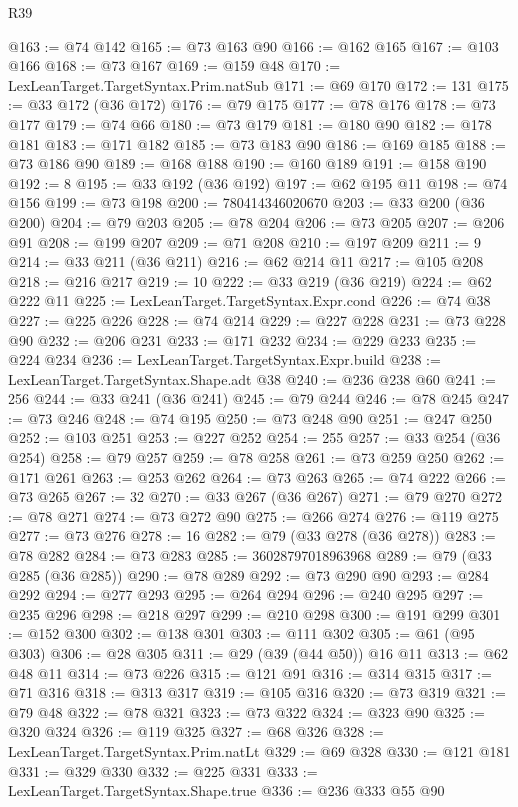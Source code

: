\begin{lexlean}{R39}
\begin{coremodule}
@163 := @74 @142
@165 := @73 @163 @90
@166 := @162 @165
@167 := @103 @166
@168 := @73 @167
@169 := @159 @48
@170 := LexLeanTarget.TargetSyntax.Prim.natSub
@171 := @69 @170
@172 := 131
@175 := @33 @172 (@36 @172)
@176 := @79 @175
@177 := @78 @176
@178 := @73 @177
@179 := @74 @66
@180 := @73 @179
@181 := @180 @90
@182 := @178 @181
@183 := @171 @182
@185 := @73 @183 @90
@186 := @169 @185
@188 := @73 @186 @90
@189 := @168 @188
@190 := @160 @189
@191 := @158 @190
@192 := 8
@195 := @33 @192 (@36 @192)
@197 := @62 @195 @11
@198 := @74 @156
@199 := @73 @198
@200 := 780414346020670
@203 := @33 @200 (@36 @200)
@204 := @79 @203
@205 := @78 @204
@206 := @73 @205
@207 := @206 @91
@208 := @199 @207
@209 := @71 @208
@210 := @197 @209
@211 := 9
@214 := @33 @211 (@36 @211)
@216 := @62 @214 @11
@217 := @105 @208
@218 := @216 @217
@219 := 10
@222 := @33 @219 (@36 @219)
@224 := @62 @222 @11
@225 := LexLeanTarget.TargetSyntax.Expr.cond
@226 := @74 @38
@227 := @225 @226
@228 := @74 @214
@229 := @227 @228
@231 := @73 @228 @90
@232 := @206 @231
@233 := @171 @232
@234 := @229 @233
@235 := @224 @234
@236 := LexLeanTarget.TargetSyntax.Expr.build
@238 := LexLeanTarget.TargetSyntax.Shape.adt @38
@240 := @236 @238 @60
@241 := 256
@244 := @33 @241 (@36 @241)
@245 := @79 @244
@246 := @78 @245
@247 := @73 @246
@248 := @74 @195
@250 := @73 @248 @90
@251 := @247 @250
@252 := @103 @251
@253 := @227 @252
@254 := 255
@257 := @33 @254 (@36 @254)
@258 := @79 @257
@259 := @78 @258
@261 := @73 @259 @250
@262 := @171 @261
@263 := @253 @262
@264 := @73 @263
@265 := @74 @222
@266 := @73 @265
@267 := 32
@270 := @33 @267 (@36 @267)
@271 := @79 @270
@272 := @78 @271
@274 := @73 @272 @90
@275 := @266 @274
@276 := @119 @275
@277 := @73 @276
@278 := 16
@282 := @79 (@33 @278 (@36 @278))
@283 := @78 @282
@284 := @73 @283
@285 := 36028797018963968
@289 := @79 (@33 @285 (@36 @285))
@290 := @78 @289
@292 := @73 @290 @90
@293 := @284 @292
@294 := @277 @293
@295 := @264 @294
@296 := @240 @295
@297 := @235 @296
@298 := @218 @297
@299 := @210 @298
@300 := @191 @299
@301 := @152 @300
@302 := @138 @301
@303 := @111 @302
@305 := @61 (@95 @303)
@306 := @28 @305
@311 := @29 (@39 (@44 @50)) @16 @11
@313 := @62 @48 @11
@314 := @73 @226
@315 := @121 @91
@316 := @314 @315
@317 := @71 @316
@318 := @313 @317
@319 := @105 @316
@320 := @73 @319
@321 := @79 @48
@322 := @78 @321
@323 := @73 @322
@324 := @323 @90
@325 := @320 @324
@326 := @119 @325
@327 := @68 @326
@328 := LexLeanTarget.TargetSyntax.Prim.natLt
@329 := @69 @328
@330 := @121 @181
@331 := @329 @330
@332 := @225 @331
@333 := LexLeanTarget.TargetSyntax.Shape.true
@336 := @236 @333 @55 @90

\end{coremodule}
\end{lexlean}
